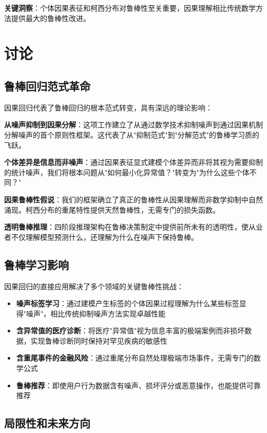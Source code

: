 \documentclass[conference]{IEEEtran}
\begin{document}
\begin{CJK}{UTF8}{gbsn}
\textbf{关键洞察}：个体因果表征和柯西分布对鲁棒性至关重要，因果理解相比传统数学方法提供最大的鲁棒性改进。

\section{讨论}
\label{sec:discussion}

\subsection{鲁棒回归范式革命}

因果回归代表了鲁棒回归的根本范式转变，具有深远的理论影响：

\textbf{从噪声抑制到因果分解}：这项工作建立了从通过数学技术抑制噪声到通过因果机制分解噪声的首个原则性框架。这代表了从"抑制范式"到"分解范式"的鲁棒学习质的飞跃。

\textbf{个体差异是信息而非噪声}：通过因果表征显式建模个体差异而非将其视为需要抑制的统计噪声，我们将根本问题从"如何最小化异常值？"转变为"为什么这些个体不同？"

\textbf{因果鲁棒性假说}：我们的框架确立了真正的鲁棒性从因果理解而非数学抑制中自然涌现。柯西分布的重尾特性提供天然鲁棒性，无需专门的损失函数。

\textbf{透明鲁棒推理}：四阶段推理架构在鲁棒决策制定中提供前所未有的透明性，使从业者不仅理解模型预测什么，还理解为什么在噪声下保持鲁棒。

\subsection{鲁棒学习影响}

因果回归的直接应用解决了多个领域的关键鲁棒性挑战：

\begin{itemize}
\item \textbf{噪声标签学习}：通过建模产生标签的个体因果过程理解为什么某些标签显得"噪声"，相比传统抑制噪声方法实现卓越性能
\item \textbf{含异常值的医疗诊断}：将医疗"异常值"视为信息丰富的极端案例而非损坏数据，实现鲁棒诊断同时保持对罕见疾病的敏感性
\item \textbf{含重尾事件的金融风险}：通过重尾分布自然处理极端市场事件，无需专门的数学公式
\item \textbf{鲁棒推荐}：即使用户行为数据含有噪声、损坏评分或恶意操作，也能提供可靠推荐
\end{itemize}

\subsection{局限性和未来方向}


\end{CJK}
\end{document}
